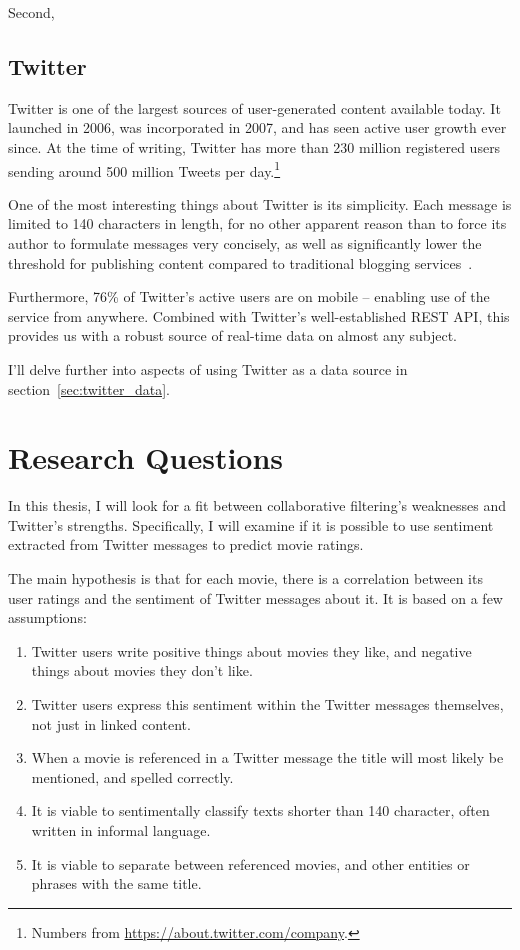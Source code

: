 Second, 

\subsection{Twitter}

Twitter is one of the largest sources of user-generated content available today. It launched in 2006, was incorporated in 2007, and has seen active user growth ever since. At the time of writing, Twitter has more than 230 million registered users sending around 500 million Tweets per day.\footnote{Numbers from \url{https://about.twitter.com/company}.}

One of the most interesting things about Twitter is its simplicity. Each message is limited to 140 characters in length, for no other apparent reason than to force its author to formulate messages very concisely, as well as significantly lower the threshold for publishing content compared to traditional blogging services~\cite{Java:2007:WWT:1348549.1348556}.

Furthermore, 76\% of Twitter's active users are on mobile -- enabling use of the service from anywhere. Combined with Twitter's well-established REST API, this provides us with a robust source of real-time data on almost any subject.

I'll delve further into aspects of using Twitter as a data source in section~\ref{sec:twitter_data}.

\section{Research Questions}

In this thesis, I will look for a fit between collaborative filtering's weaknesses and Twitter's strengths. Specifically, I will examine if it is possible to use sentiment extracted from Twitter messages to predict movie ratings.

The main hypothesis is that for each movie, there is a correlation between its user ratings and the sentiment of Twitter messages about it. It is based on a few assumptions:

\begin{enumerate}
  \item Twitter users write positive things about movies they like, and negative things about movies they don't like.
  \item Twitter users express this sentiment within the Twitter messages themselves, not just in linked content.
  \item When a movie is referenced in a Twitter message the title will most likely be mentioned, and spelled correctly.
  \item It is viable to sentimentally classify texts shorter than 140 character, often written in informal language.
  \item It is viable to separate between referenced movies, and other entities or phrases with the same title.
\end{enumerate}

